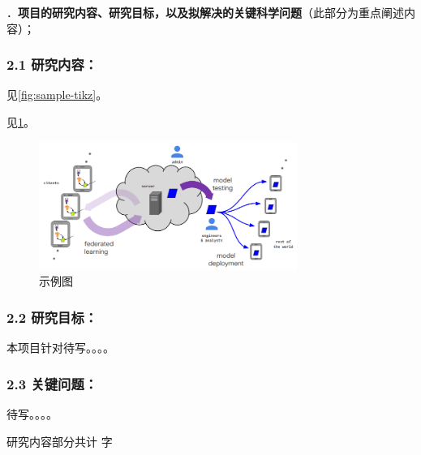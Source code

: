 {\sihao \color{MsBlue} ．{\bfseries 项目的研究内容、研究目标，以及拟解决的关键科学问题}（此部分为重点阐述内容）；}

\subsubsection{\bfseries 2.1 研究内容：}




见\cref{fig:sample-tikz}。



见\cref{fig:sample-fig}。

\begin{figure}[!htp]
\centering
\includegraphics[width=0.75\textwidth]{figures/sample-fig.png}
\caption{示例图}
\label{fig:sample-fig}
\end{figure}


\subsubsection{\bfseries 2.2 研究目标：}

本项目针对待写。。。。


\subsubsection{\bfseries 2.3 关键问题：}

待写。。。。


\ifhandout
\else
\begin{center}
{\larger[2]\color{red}  研究内容部分共计 \wordcount 字 }
\end{center}
\fi


\vskip 5mm
